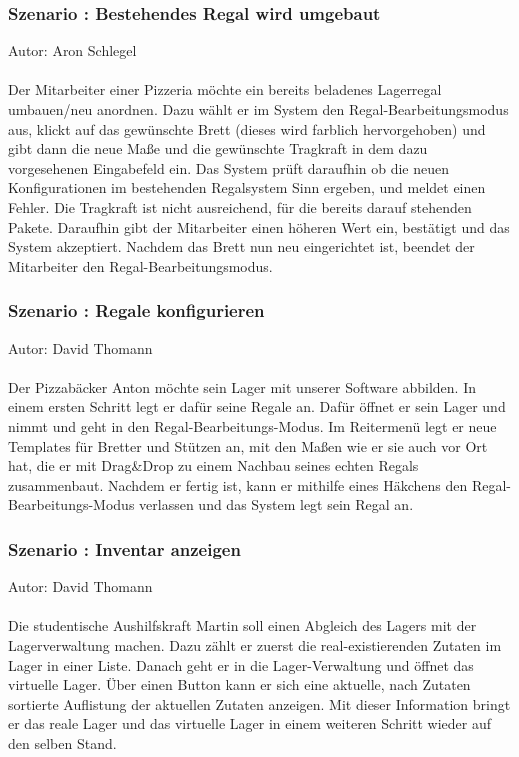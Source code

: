 \subsubsection*{Szenario \theszn: Bestehendes Regal wird umgebaut}
Autor: Aron Schlegel\\~\\
Der Mitarbeiter einer Pizzeria möchte ein bereits beladenes Lagerregal umbauen/neu anordnen. Dazu wählt er im System den Regal-Bearbeitungsmodus aus, klickt auf das gewünschte Brett (dieses wird farblich hervorgehoben) und gibt dann die neue Maße und die gewünschte Tragkraft in dem dazu vorgesehenen Eingabefeld ein. Das System prüft daraufhin ob die neuen Konfigurationen im bestehenden Regalsystem Sinn ergeben, und meldet einen Fehler. Die Tragkraft ist nicht ausreichend, für die bereits darauf stehenden Pakete. Daraufhin gibt der Mitarbeiter einen höheren Wert ein, bestätigt und das System akzeptiert. Nachdem das Brett nun neu eingerichtet ist, beendet der Mitarbeiter den Regal-Bearbeitungsmodus. 
\subsubsection*{Szenario \theszn: Regale konfigurieren}
Autor: David Thomann\\~\\
Der Pizzabäcker Anton möchte sein Lager mit unserer Software abbilden. In einem ersten Schritt legt er dafür seine Regale an. Dafür öffnet er sein Lager und nimmt und geht in den Regal-Bearbeitungs-Modus. Im Reitermenü legt er neue Templates für Bretter und Stützen an, mit den Maßen wie er sie auch vor Ort hat, die er mit Drag\&Drop zu einem Nachbau seines echten Regals zusammenbaut. Nachdem er fertig ist, kann er mithilfe eines Häkchens den Regal-Bearbeitungs-Modus verlassen und das System legt sein Regal an. 
\subsubsection*{Szenario \theszn: Inventar anzeigen}
Autor: David Thomann\\~\\
Die studentische Aushilfskraft Martin soll einen Abgleich des Lagers mit der Lagerverwaltung machen. Dazu zählt er zuerst die real-existierenden Zutaten im Lager in einer Liste. Danach geht er in die Lager-Verwaltung und öffnet das virtuelle Lager. Über einen Button kann er sich eine aktuelle, nach Zutaten sortierte Auflistung der aktuellen Zutaten anzeigen. Mit dieser Information bringt er das reale Lager und das virtuelle Lager in einem weiteren Schritt wieder auf den selben Stand.
\newpage
